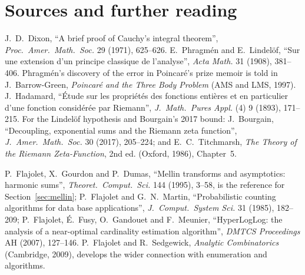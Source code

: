 \section*{Sources and further reading}

J.~D.~Dixon, ``A brief proof of Cauchy's integral theorem'', \emph{Proc.\ Amer.\ Math.\ Soc.} 29 (1971), 625--626. E.~Phragm\'en and E.~Lindel\"of, ``Sur une extension d'un principe classique de
l'analyse'', \emph{Acta Math.} 31 (1908), 381--406. Phragm\'en's discovery of the error in Poincar\'e's prize memoir is told in J.~Barrow-Green, \emph{Poincar\'e and the Three
Body Problem} (AMS and LMS, 1997). J.~Hadamard, ``\'Etude sur les propri\'et\'es des fonctions enti\`eres et en particulier d'une fonction consid\'er\'ee par Riemann'', \emph{J.\ Math.\
Pures Appl.} (4) 9 (1893), 171--215. For the Lindel\"of hypothesis and Bourgain's 2017 bound: J.~Bourgain, ``Decoupling, exponential sums and the Riemann zeta function'', \emph{J.\ Amer.\ Math.\
Soc.} 30 (2017), 205--224; and E.~C.~Titchmarsh, \emph{The Theory of the Riemann Zeta-Function}, 2nd ed. (Oxford, 1986), Chapter~5.

P.~Flajolet, X.~Gourdon and P.~Dumas, ``Mellin transforms and asymptotics: harmonic sums'', \emph{Theoret.\ Comput.\ Sci.} 144 (1995), 3--58, is the reference for Section~\ref{sec:mellin}; P.~Flajolet
and G.~N.~Martin, ``Probabilistic counting algorithms for data base applications'', \emph{J.\ Comput.\ System Sci.} 31 (1985), 182--209; P.~Flajolet, \'E.~Fusy, O.~Gandouet and F.~Meunier,
``HyperLogLog: the analysis of a near-optimal cardinality estimation algorithm'', \emph{DMTCS Proceedings} AH (2007), 127--146. P.~Flajolet and R.~Sedgewick, \emph{Analytic Combinatorics}
(Cambridge, 2009), develops the wider connection with enumeration and algorithms.
